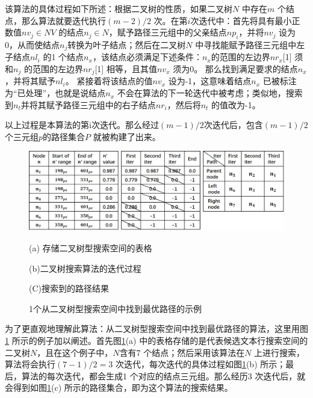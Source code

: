         该算法的具体过程如下所述：根据二叉树的性质，如果二叉树$N$ 中存在$m$ 个结点，那么算法就要迭代执行$(m-2)/2$ 次。在第$i$次迭代中：首先将具有最小正数值$nv_j \in NV$ 的结点$n_j \in N$，赋予路径三元组中的父亲结点$np_i$，并将$nv_j$ 设为0，从而使结点$n_j$转换为叶子结点；然后在二叉树$N$ 中寻找能赋予路径三元组中左子结点$nl_i$ 的1 个结点$n_x$，该结点必须满足下述条件：$n_x$的范围的左边界$nr_x$[1] 须和$n_j$ 的范围的左边界$nr_j$[1] 相等，且其值$nv_x$ 须为0。 那么找到满足要求的结点$n_x$，并将其赋予$nl_i$。 紧接着将该结点的值$nv_x$ 设为-1，这意味着结点$n_x$ 已被标注为``已处理''，也就是说结点$n_x$ 不会在算法的下一轮迭代中被考虑；类似地，搜索到$n_t$并将其赋予路径三元组中的右子结点$nr_i$，然后将$n_t$ 的值改为-1。

        以上过程是本算法的第i次迭代。那么经过$(m-1)/2$次迭代后，包含$(m-1)/2$ 个三元组$p$的路径集合$P$ 就被构建了出来。

        \begin{figure}[!h]
        \centering
        \includegraphics[width=\textwidth]{./figures/c4_bianry_tree_search.jpg}
        \begin{minipage}[t]{0.33\linewidth}
        \centerline{\small (a) 存储二叉树型搜索空间的表格}
        \end{minipage}
        \begin{minipage}[t]{0.33\linewidth}
        \centerline{\small(b)二叉树搜索算法的迭代过程}
        \end{minipage}
        \begin{minipage}[t]{0.26\linewidth}
        \centerline{\small(C)搜索到的路径结果}
        \end{minipage}
        \caption{1个从二叉树型搜索空间中找到最优路径的示例}
        \label{fig.c4_bianry_tree_search}
        \end{figure}

        为了更直观地理解此算法：从二叉树型搜索空间中找到最优路径的算法，这里用图\ref{fig.c4_bianry_tree_search} 所示的例子加以阐述。首先图\ref{fig.c4_bianry_tree_search}(a) 中的表格存储的是代表候选文本行搜索空间的二叉树$N$，且在这个例子中，$N$含有7 个结点；然后采用该算法在$N$ 上进行搜索，算法将会执行$(7-1)/2=3$ 次迭代，每次迭代的具体过程如图\ref{fig.c4_bianry_tree_search}(b) 所示；最后，算法的每次迭代，都会生成1 个对应的结点三元组。那么经历3 次迭代后，就会得到如图\ref{fig.c4_bianry_tree_search}(c) 所示的路径集合，即为这个算法的搜索结果。

